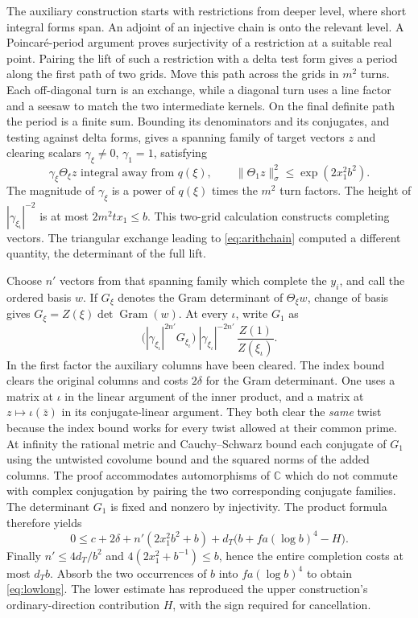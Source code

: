 The auxiliary construction starts with restrictions from deeper level, where short integral forms span. An adjoint of an injective chain is onto the relevant level. A Poincaré-period argument proves surjectivity of a restriction at a suitable real point. Pairing the lift of such a restriction with a delta test form gives a period along the first path of two grids. Move this path across the grids in $m^2$ turns. Each off-diagonal turn is an exchange, while a diagonal turn uses a line factor and a seesaw to match the two intermediate kernels. On the final definite path the period is a finite sum. Bounding its denominators and its conjugates, and testing against delta forms, gives a spanning family of target vectors $z$ and clearing scalars $\gamma_\xi\ne0$, $\gamma_1=1$, satisfying
\[
 \gamma_\xi\Theta_\xi z\text{ integral away from }q(\xi),\qquad
 \|\Theta_1 z\|^2_\sigma\le\exp(2x_1^2 b^2).
\]
The magnitude of $\gamma_\xi$ is a power of $q(\xi)$ times the $m^2$ turn factors. The height of $|\gamma_{\xi_\iota}|^{-2}$ is at most $2m^2tx_1\le b$. This two-grid calculation constructs completing vectors. The triangular exchange leading to \eqref{eq:arithchain} computed a different quantity, the determinant of the full lift.

Choose $n'$ vectors from that spanning family which complete the $y_i$, and call the ordered basis $w$. If $G_\xi$ denotes the Gram determinant of $\Theta_\xi w$, change of basis gives $G_\xi=Z(\xi)\det\operatorname{Gram}(w)$. At every $\iota$, write $G_1$ as
\[
 \bigl(|\gamma_{\xi_\iota}|^{2n'}G_{\xi_\iota}\bigr)
 \ |\gamma_{\xi_\iota}|^{-2n'}\,
 \frac{Z(1)}{Z(\xi_\iota)} .
\]
In the first factor the auxiliary columns have been cleared. The index bound clears the original columns and costs $2\delta$ for the Gram determinant. One uses a matrix at $\iota$ in the linear argument of the inner product, and a matrix at $z\mapsto\iota(\bar z)$ in its conjugate-linear argument. They both clear the \emph{same} twist because the index bound works for every twist allowed at their common prime. At infinity the rational metric and Cauchy--Schwarz bound each conjugate of $G_1$ using the untwisted covolume bound and the squared norms of the added columns. The proof accommodates automorphisms of $\mathbb C$ which do not commute with complex conjugation by pairing the two corresponding conjugate families. The determinant $G_1$ is fixed and nonzero by injectivity. The product formula therefore yields
\[
 0\le c+2\delta+n'(2x_1^2 b^2+b)
                  +d_T\bigl(b+fa(\log b)^4-H\bigr).
\]
Finally $n'\le4d_T/b^2$ and $4(2x_1^2+b^{-1})\le b$, hence the entire completion costs at most $d_Tb$. Absorb the two occurrences of $b$ into $fa(\log b)^4$ to obtain \eqref{eq:lowlong}. The lower estimate has reproduced the upper construction's ordinary-direction contribution $H$, with the sign required for cancellation.
